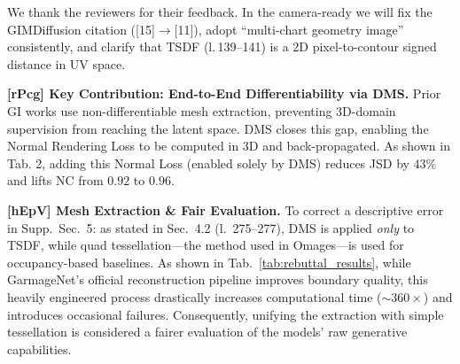 \documentclass[10pt,twocolumn,letterpaper]{article}
\begin{document}

\maketitle
\thispagestyle{empty}
\appendix

\newcommand{\rev}[1]{\textcolor{eccvblue}{[#1]}}

\setlength{\textfloatsep}{5pt}
\setlength{\intextsep}{5pt}
\setlength{\floatsep}{5pt}
\setlength{\abovecaptionskip}{2pt}
\setlength{\belowcaptionskip}{0pt}



\noindent We thank the reviewers for their feedback. In the camera-ready we will fix the GIMDiffusion citation ([15]$\to$[11]), adopt ``multi-chart geometry image'' consistently, and clarify that TSDF (l.\,139--141) is a 2D pixel-to-contour signed distance in UV space.

\medskip
\noindent\textbf{\rev{rPcg} Key Contribution: End-to-End Differentiability via DMS.} Prior GI works use non-differentiable mesh extraction, preventing 3D-domain supervision from reaching the latent space. DMS closes this gap, enabling the Normal Rendering Loss to be computed in 3D and back-propagated. As shown in Tab. 2, adding this Normal Loss (enabled solely by DMS) reduces JSD by $43\%$ and lifts NC from $0.92$ to $0.96$.

\noindent\textbf{\rev{hEpV} Mesh Extraction \& Fair Evaluation.} To correct a descriptive error in Supp.~Sec.~5: as stated in Sec.~4.2 (l.~275--277), DMS is applied \emph{only} to TSDF, while quad tessellation—the method used in Omages—is used for occupancy-based baselines. As shown in Tab.~\ref{tab:rebuttal_results}, while GarmageNet's official reconstruction pipeline improves boundary quality, this heavily engineered process drastically increases computational time (${\sim}360\times$) and introduces occasional failures. Consequently, unifying the extraction with simple tessellation is considered a fairer evaluation of the models' raw generative capabilities.
\end{document}
